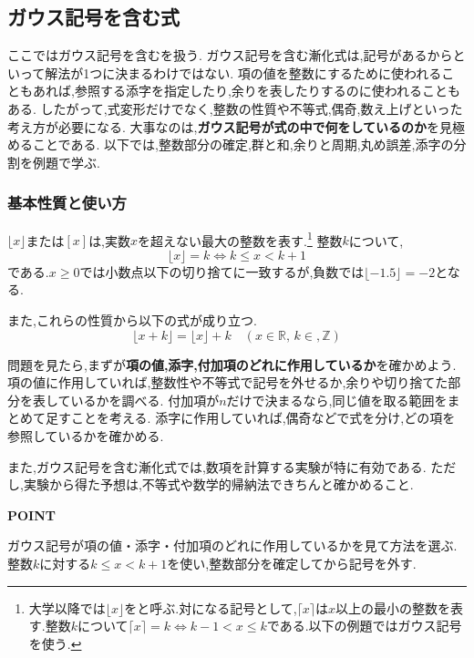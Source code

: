 \subsection{ガウス記号を含む式}\label{節：ガウス記号を含む式}
  ここではガウス記号を含むを扱う.
  ガウス記号を含む漸化式は,記号があるからといって解法が1つに決まるわけではない.
  項の値を整数にするために使われることもあれば,参照する添字を指定したり,余りを表したりするのに使われることもある.
  したがって,式変形だけでなく,整数の性質や不等式,偶奇,数え上げといった考え方が必要になる.
  大事なのは,\textbf{ガウス記号が式の中で何をしているのか}を見極めることである.
  以下では,整数部分の確定,群と和,余りと周期,丸め誤差,添字の分割を例題で学ぶ.
  
\subsubsection{基本性質と使い方}\label{節：基本性質と使い方}
  $\lfloor x\rfloor$または$[x]$は,実数$x$を超えない最大の整数を表す.\footnote{大学以降では$\lfloor x\rfloor$をと呼ぶ.対になる記号として,$\lceil x\rceil$は$x$以上の最小の整数を表す.整数$k$について$\lceil x\rceil=k\iff k-1<x\le k$である.以下の例題ではガウス記号を使う.}
  整数$k$について,
  \[
    \lfloor x\rfloor=k\iff k\le x<k+1
  \]
  である.$x\ge0$では小数点以下の切り捨てに一致するが,負数では$\lfloor-1.5\rfloor=-2$となる.

  \BookFigFloorGraph

  また,これらの性質から以下の式が成り立つ.
  \[  
    \lfloor x+k \rfloor=\lfloor x \rfloor +k \quad (x \in \mathbb{R},\,k \in ,\mathbb{Z})
  \]
  
  問題を見たら,まずが\textbf{項の値,添字,付加項のどれに作用しているか}を確かめよう.
  項の値に作用していれば,整数性や不等式で記号を外せるか,余りや切り捨てた部分を表しているかを調べる.
  付加項が$n$だけで決まるなら,同じ値を取る範囲をまとめて足すことを考える.
  添字に作用していれば,偶奇などで式を分け,どの項を参照しているかを確かめる.
  
  また,ガウス記号を含む漸化式では,数項を計算する実験が特に有効である.
  ただし,実験から得た予想は,不等式や数学的帰納法できちんと確かめること.
  
  \begin{bookpoint}
    \textbf{POINT}\par
    ガウス記号が項の値・添字・付加項のどれに作用しているかを見て方法を選ぶ.
    整数$k$に対する$k\le x<k+1$を使い,整数部分を確定してから記号を外す.
  \end{bookpoint}
  
